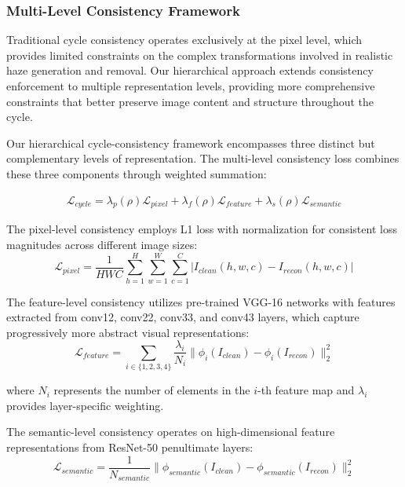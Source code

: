 \documentclass{article}
\begin{document}
\subsubsection{Multi-Level Consistency Framework}

Traditional cycle consistency operates exclusively at the pixel level, which provides limited constraints on the complex transformations involved in realistic haze generation and removal. Our hierarchical approach extends consistency enforcement to multiple representation levels, providing more comprehensive constraints that better preserve image content and structure throughout the cycle.

Our hierarchical cycle-consistency framework encompasses three distinct but complementary levels of representation. The multi-level consistency loss combines these three components through weighted summation:

\begin{align}
\mathcal{L}_{cycle} = \lambda_p(\rho) \mathcal{L}_{pixel} + \lambda_f(\rho) \mathcal{L}_{feature} + \lambda_s(\rho) \mathcal{L}_{semantic}
\end{align}

The pixel-level consistency employs L1 loss with normalization for consistent loss magnitudes across different image sizes:
\begin{equation}
\mathcal{L}_{pixel} = \frac{1}{HWC} \sum_{h=1}^{H} \sum_{w=1}^{W} \sum_{c=1}^{C} |I_{clean}(h,w,c) - I_{recon}(h,w,c)|
\end{equation}

The feature-level consistency utilizes pre-trained VGG-16 networks with features extracted from conv1\textunderscore{}2, conv2\textunderscore{}2, conv3\textunderscore{}3, and conv4\textunderscore{}3 layers, which capture progressively more abstract visual representations:
\begin{equation}
\mathcal{L}_{feature} = \sum_{i \in \{1,2,3,4\}} \frac{\lambda_i}{N_i} \|\phi_i(I_{clean}) - \phi_i(I_{recon})\|_2^2
\end{equation}

where $N_i$ represents the number of elements in the $i$-th feature map and $\lambda_i$ provides layer-specific weighting.

The semantic-level consistency operates on high-dimensional feature representations from ResNet-50 penultimate layers:
\begin{equation}
\mathcal{L}_{semantic} = \frac{1}{N_{semantic}} \|\phi_{semantic}(I_{clean}) - \phi_{semantic}(I_{recon})\|_2^2
\end{equation}
\end{document}
